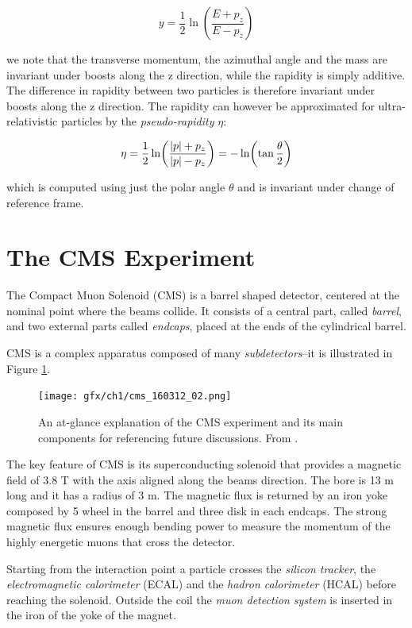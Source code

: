 \begin{equation*}
    y = \frac{1}{2}\ln(\frac{E + p_z}{E - p_z})
\end{equation*}

we note that the transverse momentum, the azimuthal angle and the mass are invariant under boosts
along the z direction, while the rapidity is simply additive. The difference in rapidity between two particles is therefore invariant under boosts along the z direction.
The rapidity can however be approximated for ultra-relativistic particles by the \emph{pseudo-rapidity} $\eta$:

\begin{equation*}
    \eta = \frac{1}{2}\ln(\frac{\abs{p}+ p_z}{\abs{p} - p_z}) = -\ln(\tan\frac{\theta}{2}) 
\end{equation*}

which is computed using just the polar angle $\theta$ and is invariant under change of reference frame.

\section{The CMS Experiment}

The Compact Muon Solenoid (CMS) is a barrel shaped detector, centered at the
nominal point where the beams collide. It consists of a central part, called \emph{barrel},
and two external parts called \emph{endcaps}, placed at the ends of the cylindrical barrel.

CMS is a complex apparatus composed of many \emph{subdetectors}--it is illustrated in Figure \ref{fig:cms}.

\begin{figure}
    \centering
    \texttt{[image: gfx/ch1/cms\_160312\_02.png]}
    \caption[CMS]{An at-glance explanation of the CMS experiment and its main components for referencing future discussions. From \cite{decmod}.}
    \label{fig:cms}
\end{figure}

The key feature of CMS is its superconducting solenoid that provides a magnetic field of
3.8 T with the axis aligned along the beams direction. The bore is 13 m long and
it has a radius of 3 m. The magnetic flux is returned by an iron yoke composed by
5 wheel in the barrel and three disk in each endcaps. The strong magnetic flux ensures enough bending power to measure the momentum of the highly energetic muons that
cross the detector.

Starting from the interaction point a particle crosses the\emph{ silicon tracker}, the \emph{electromagnetic calorimeter} (ECAL) and the \emph{hadron calorimeter} (HCAL) before reaching
the solenoid. Outside the coil the \emph{muon detection system} is inserted in the iron of the
yoke of the magnet.

